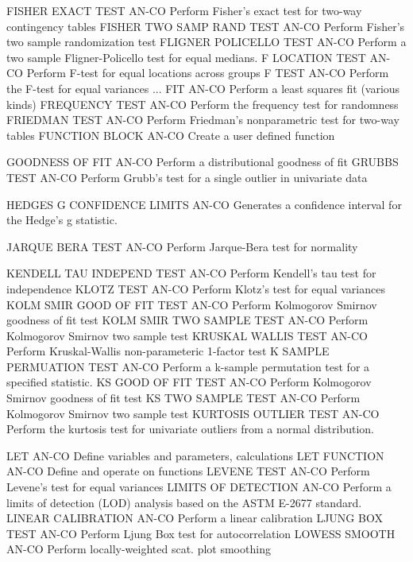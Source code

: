 FISHER EXACT TEST           AN-CO Perform Fisher's exact test for two-way contingency tables
FISHER TWO SAMP RAND TEST   AN-CO Perform Fisher's two sample randomization test
FLIGNER POLICELLO TEST      AN-CO Perform a two sample Fligner-Policello test for equal medians.
F LOCATION TEST             AN-CO Perform F-test for equal locations across groups
F TEST                      AN-CO Perform the F-test for equal variances
... FIT                     AN-CO Perform a least squares fit (various kinds)
FREQUENCY TEST              AN-CO Perform the frequency test for randomness
FRIEDMAN TEST               AN-CO Perform Friedman's nonparametric test for two-way tables
FUNCTION BLOCK              AN-CO Create a user defined function

GOODNESS OF FIT             AN-CO Perform a distributional goodness of fit
GRUBBS TEST                 AN-CO Perform Grubb's test for a single outlier in univariate data

HEDGES G CONFIDENCE LIMITS  AN-CO Generates a confidence interval for the Hedge's g statistic.

JARQUE BERA TEST            AN-CO Perform Jarque-Bera test for normality

KENDELL TAU INDEPEND TEST   AN-CO Perform Kendell's tau test for independence
KLOTZ TEST                  AN-CO Perform Klotz's test for equal variances
KOLM SMIR GOOD OF FIT TEST  AN-CO Perform Kolmogorov Smirnov goodness of fit test
KOLM SMIR TWO SAMPLE TEST   AN-CO Perform Kolmogorov Smirnov two sample test
KRUSKAL WALLIS TEST         AN-CO Perform Kruskal-Wallis non-parameteric 1-factor test
K SAMPLE PERMUATION TEST    AN-CO Perform a k-sample permutation test for a specified statistic.
KS GOOD OF FIT TEST         AN-CO Perform Kolmogorov Smirnov goodness of fit test
KS TWO SAMPLE TEST          AN-CO Perform Kolmogorov Smirnov two sample test
KURTOSIS OUTLIER TEST       AN-CO Perform the kurtosis test for univariate outliers from a normal distribution.

LET                         AN-CO Define variables and parameters, calculations
LET FUNCTION                AN-CO Define and operate on functions
LEVENE TEST                 AN-CO Perform Levene's test for equal variances
LIMITS OF DETECTION         AN-CO Perform a limits of detection (LOD) analysis based on the ASTM E-2677 standard.
LINEAR CALIBRATION          AN-CO Perform a linear calibration
LJUNG BOX TEST              AN-CO Perform Ljung Box test for autocorrelation
LOWESS SMOOTH               AN-CO Perform locally-weighted scat. plot smoothing

